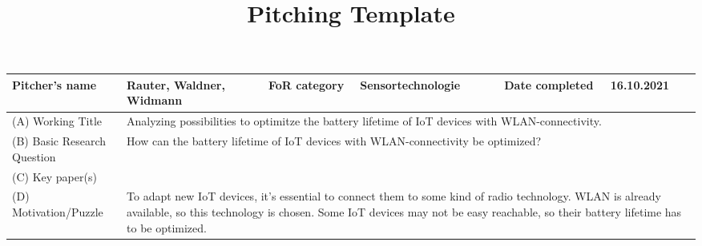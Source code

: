 \documentclass[10pt,table]{article}
\title{Pitching Template}
\date{}
\providecommand{\lgc}{\cellcolor{lightgray}}
\begin{document}
\begin{center}
	\begin{longtable}{p{4.5cm}p{4cm}p{2.5cm}p{4cm}p{2.5cm}p{3.5cm}}
		\toprule
		\lgc Pitcher's name              & Rauter, Waldner, Widmann                                                                                                                                                                                                                                                                                                                                                                                                                             & \lgc FoR category & Sensortechnologie & \lgc Date completed & 16.10.2021 \\
		\midrule
		\lgc (A) Working Title           & \multicolumn{5}{p{18cm}}{Analyzing possibilities to optimitze the battery lifetime of IoT devices with WLAN-connectivity.}                                                                                                                                                                                                                                                                                                                                                                                                      \\[1ex]
		\lgc (B) Basic Research Question & \multicolumn{5}{p{18cm}}{How can the battery lifetime of IoT devices with WLAN-connectivity be optimized?}                                                                                                                                                                                                                                                                                                                                                                                                                      \\[1ex]
		\lgc (C) Key paper(s)            & \multicolumn{5}{p{18cm}}{\cite{mesquita_assessing_2018} \cite{montori_is_2017}}                                                                                                                                                                                                                                                                                                                                                                                                                                                 \\[1ex]
		\lgc (D) Motivation/Puzzle       & \multicolumn{5}{p{18cm}}{To adapt new IoT devices, it's essential to connect them to some kind of radio technology. WLAN is already available, so this technology is chosen. Some IoT devices may not be easy reachable, so their battery lifetime has to be optimized.}                                                                                                                                                                                                                                                        \\[1ex]

\end{longtable}
\end{center}
\end{document}
